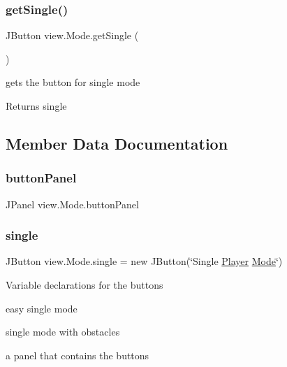 \subsubsection{\texorpdfstring{get\+Single()}{getSingle()}}
{\footnotesize\ttfamily J\+Button view.\+Mode.\+get\+Single (\begin{DoxyParamCaption}{ }\end{DoxyParamCaption})}



gets the button for single mode 

\begin{DoxyReturn}{Returns}
single 
\end{DoxyReturn}


\subsection{Member Data Documentation}
\hypertarget{classview_1_1_mode_ab457e88b13dca6e72659a05f9d6d7853}{}\label{classview_1_1_mode_ab457e88b13dca6e72659a05f9d6d7853} 
\subsubsection{\texorpdfstring{button\+Panel}{buttonPanel}}
{\footnotesize\ttfamily J\+Panel view.\+Mode.\+button\+Panel\hspace{0.3cm}{\ttfamily [private]}}

\hypertarget{classview_1_1_mode_a79eea473b39369327297c8788dd071c2}{}\label{classview_1_1_mode_a79eea473b39369327297c8788dd071c2} 
\subsubsection{\texorpdfstring{single}{single}}
{\footnotesize\ttfamily J\+Button view.\+Mode.\+single = new J\+Button(\char`\"{}Single \hyperlink{classmodel_1_1_player}{Player} \hyperlink{classview_1_1_mode}{Mode}\char`\"{})\hspace{0.3cm}{\ttfamily [private]}}

Variable declarations for the buttons
\begin{DoxyItemize}
\item easy single mode
\item single mode with obstacles
\item a panel that contains the buttons 
\end{DoxyItemize}\hypertarget{classview_1_1_mode_a015d017e7fa759ee77d191c4d03ee531}{}\label{classview_1_1_mode_a015d017e7fa759ee77d191c4d03ee531} 
